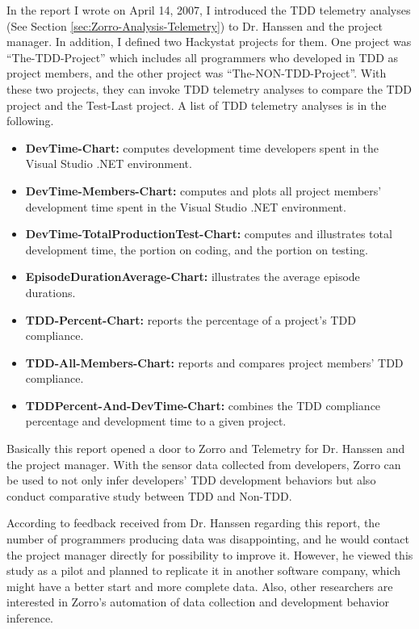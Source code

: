 In the report I wrote on April 14, 2007, I introduced the TDD telemetry analyses (See Section \ref{sec:Zorro-Analysis-Telemetry}) to Dr. Hanssen and the project manager. In addition, I defined two Hackystat projects for them. One project was ``The-TDD-Project'' which includes all programmers who developed in TDD as project members, and the other project was ``The-NON-TDD-Project''.  With these two projects, they can invoke TDD telemetry analyses to compare the TDD project and the Test-Last project. A list of TDD telemetry analyses is in the following.

\begin{itemize}
\item {\textbf{DevTime-Chart:}} computes development time developers spent in the Visual Studio .NET environment.  
 
\item {\textbf{DevTime-Members-Chart:}} computes and plots all project members' development time spent in the Visual Studio .NET environment.

\item {\textbf{DevTime-TotalProductionTest-Chart:}} computes and illustrates total development time, the portion on coding, and the portion on testing. 
 
\item {\textbf{EpisodeDurationAverage-Chart:}} illustrates the average episode durations.

\item {\textbf{TDD-Percent-Chart:}} reports the percentage of a project's TDD compliance.
 
\item {\textbf{TDD-All-Members-Chart:}} reports and compares project members' TDD compliance.

\item {\textbf{TDDPercent-And-DevTime-Chart:}} combines the TDD compliance percentage and development time to a given project.
\end{itemize}

Basically this report opened a door to Zorro and Telemetry for Dr. Hanssen and the project manager. With the sensor data collected from developers, Zorro can be used to not only infer developers' TDD development behaviors but also conduct comparative study between TDD and Non-TDD.  

According to feedback received from Dr. Hanssen regarding this report, the number of programmers producing data was disappointing, and he would contact the project manager directly for possibility to improve it. However, he viewed this study as a pilot and planned to replicate it in another software company, which might have a better start and more complete data. Also, other researchers are interested in Zorro's automation of data collection and development behavior inference. 

